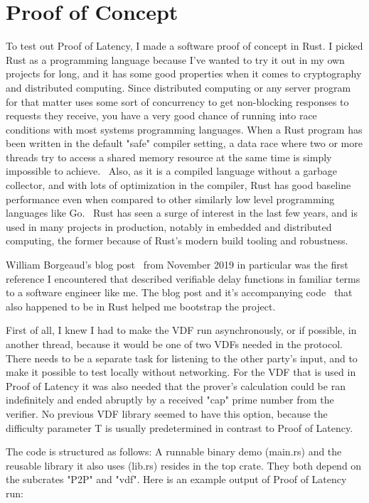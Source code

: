 \chapter{Proof of Concept}
\label{Proof of Concept}
To test out Proof of Latency, I made a software proof of concept in Rust. I picked Rust as a programming language because I've wanted to try it out in my own projects for long, and it has some good properties when it comes to cryptography and distributed computing. Since distributed computing or any server program for that matter uses some sort of concurrency to get non-blocking responses to requests they receive, you have a very good chance of running into race conditions with most systems programming languages. When a Rust program has been written in the default "safe" compiler setting, a data race where two or more threads try to access a shared memory resource at the same time is simply impossible to achieve.~\cite{The_Rust_Project_Developers2018-xh} Also, as it is a compiled language without a garbage collector, and with lots of optimization in the compiler, Rust has good baseline performance even when compared to other similarly low level programming languages like Go.~\cite{Howarth2020-zc} Rust has seen a surge of interest in the last few years, and is used in many projects in production, notably in embedded and distributed computing, the former because of Rust's modern build tooling and robustness.

William Borgeaud's blog post~\cite{Borgeaud2019-wk} from November 2019 in particular was the first reference I encountered that described verifiable delay functions in familiar terms to a software engineer like me. The blog post and it's accompanying code~\cite{Borgeaud2019-wk} that also happened to be in Rust helped me bootstrap the project.

First of all, I knew I had to make the VDF run asynchronously, or if possible, in another thread, because it would be one of two VDFs needed in the protocol. There needs to be a separate task for listening to the other party's input, and to make it possible to test locally without networking. For the VDF that is used in Proof of Latency it was also needed that the prover's calculation could be ran indefinitely and ended abruptly by a received "cap" prime number from the verifier. No previous VDF library seemed to have this option, because the difficulty parameter T is usually predetermined in contrast to Proof of Latency.

The code is structured as follows: A runnable binary demo (main.rs) and the reusable library it also uses (lib.rs) resides in the top crate. They both depend on the subcrates "P2P" and "vdf". Here is an example output of Proof of Latency run:

